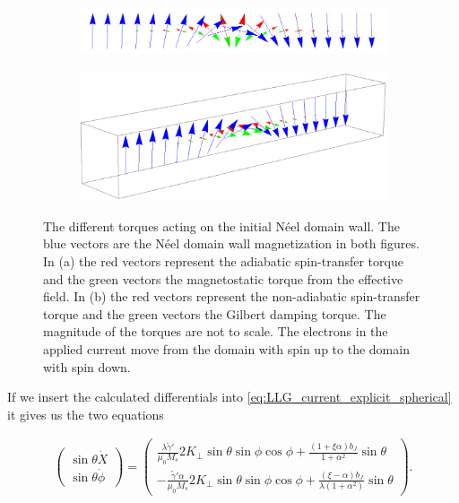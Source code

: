 \documentclass[1p]{elsarticle}		%
\numberwithin{equation}{section}
\begin{document}
\begin{figure}[h!]
\centering
\begin{subfigure}{\textwidth}
  \centering
  \includegraphics[width=1.0\linewidth]{Figures/NeelWallAdSTTHeff.png}
  \caption{}
  \label{fig:Neel_AdSTT_Heff}
\end{subfigure}
\begin{subfigure}{\textwidth}
  \centering
  \includegraphics[width=1.0\linewidth]{Figures/NeelWallNonAdSTTGD.png}
  \caption{}
  \label{fig:Neel_NonAdSTT_GD}
\end{subfigure}
\caption{The different torques acting on the initial N\'{e}el domain wall. The blue vectors are the N\'{e}el domain wall magnetization in both figures. In (a) the red vectors represent the adiabatic spin-transfer torque and the green vectors the magnetostatic torque from the effective field. In (b) the red vectors represent the non-adiabatic spin-transfer torque and the green vectors the Gilbert damping torque. The magnitude of the torques are not to scale. The electrons in the applied current move from the domain with spin up to the domain with spin down.}
\end{figure}

If we insert the calculated differentials into \eqref{eq:LLG_current_explicit_spherical} it gives us the two equations

\begin{align*}
\begin{pmatrix}
\sin\theta\dot{X} \\ \sin\theta\dot{\phi}
\end{pmatrix}
=
\begin{pmatrix}
\frac{\lambda \tilde{\gamma}'}{\mu_0 M_s} 2 K_{\perp} \sin\theta\sin\phi\cos\phi + \frac{(1+\xi\alpha)b_J}{1+\alpha^2}\sin\theta \\
-\frac{\tilde{\gamma}'\alpha}{\mu_0 M_s}2 K_{\perp} \sin\theta\sin\phi\cos\phi + \frac{(\xi-\alpha)b_J}{\lambda(1+\alpha^2)}\sin\theta
\end{pmatrix}.
\end{align*}
\end{document}
